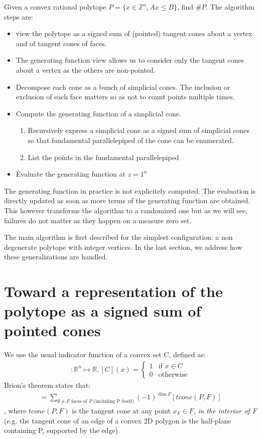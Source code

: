 \documentclass[14pt]{article}
\newcommand{\R}{\mathbb{R}}
\newcommand{\Z}{\mathbb{Z}}
\begin{document}
Given a convex rational polytope $P = \{x \in \Z^n, Ax \le B\}$, find $\#P$.
The algorithm steps are:
\begin{itemize}
  \item view the polytope as a signed sum of (pointed) tangent cones about a vertex and of tangent cones of faces.
\item The generating function view allows us to consider only the tangent cones about a vertex as the others are non-pointed.
\item Decompose each cone as a bunch of simplicial cones. The inclusion or exclusion of each face matters so as not to count points multiple times.
\item Compute the generating function of a simplicial cone.
    \begin{enumerate}
  \item Recursively express a simplicial cone as a signed sum of simplicial cones so that fundamental parallelepiped of the cone can be enumerated.
  \item List the points in the fundamental parallelepiped
    \end{enumerate}
\item Evaluate the generating function at $z=1^n$
\end{itemize}


The generating function in practice is not explicitely computed. The evaluation is directly updated as soon as more terms of the generating function are obtained.
This however transforms the algorithm to a randomized one but as we will see, failures do not matter as they happen on a measure zero set.


The main algorithm is first described for the simplest configuration: a non degenerate polytope with integer vertices.
In the last section, we address how these generalizations are handled.


\section*{Toward a representation of the polytope as a signed sum of pointed cones}

We use the usual indicator function of a convex set C, defined as:
\begin{align*}
[C]: \R^n  \mapsto \R, [C](x) = \begin{cases}1& \text{if }x \in C\\  0 & \text{otherwise} \end{cases}
\end{align*}
Brion's theorem states that:
\begin{align*}
  [P] = \sum_{\emptyset \neq F\text{ faces of }P\text{ (including P itself)}} (-1)^{\dim F} \left[tcone(P,F)\right]
\end{align*}, where $tcone(P,F)$ is the tangent cone at any point $x_F \in F$, {\em in the interior of $F$} (e.g. the tangent cone of an edge of a convex 2D polygon is the half-plane containing P, supported by the edge)
\end{document}
